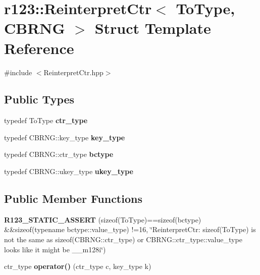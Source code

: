 \hypertarget{structr123_1_1ReinterpretCtr}{}\section{r123\+:\+:Reinterpret\+Ctr$<$ To\+Type, C\+B\+R\+NG $>$ Struct Template Reference}
\label{structr123_1_1ReinterpretCtr}


{\ttfamily \#include $<$Reinterpret\+Ctr.\+hpp$>$}

\subsection*{Public Types}
\begin{DoxyCompactItemize}
\item 
\hypertarget{structr123_1_1ReinterpretCtr_a26cf9e933b35411c37070c948085ba02}{}\label{structr123_1_1ReinterpretCtr_a26cf9e933b35411c37070c948085ba02} 
typedef To\+Type {\bfseries ctr\+\_\+type}
\item 
\hypertarget{structr123_1_1ReinterpretCtr_a470b21676ed709aa9d9ad524a67410f1}{}\label{structr123_1_1ReinterpretCtr_a470b21676ed709aa9d9ad524a67410f1} 
typedef C\+B\+R\+N\+G\+::key\+\_\+type {\bfseries key\+\_\+type}
\item 
\hypertarget{structr123_1_1ReinterpretCtr_ae0accaee618b5eb28a24acd516b3a4c6}{}\label{structr123_1_1ReinterpretCtr_ae0accaee618b5eb28a24acd516b3a4c6} 
typedef C\+B\+R\+N\+G\+::ctr\+\_\+type {\bfseries bctype}
\item 
\hypertarget{structr123_1_1ReinterpretCtr_a4b0b69c1aa58d62bb22e51e16c586bee}{}\label{structr123_1_1ReinterpretCtr_a4b0b69c1aa58d62bb22e51e16c586bee} 
typedef C\+B\+R\+N\+G\+::ukey\+\_\+type {\bfseries ukey\+\_\+type}
\end{DoxyCompactItemize}
\subsection*{Public Member Functions}
\begin{DoxyCompactItemize}
\item 
\hypertarget{structr123_1_1ReinterpretCtr_ad6fe140cb2f1aa215c4741f646249b16}{}\label{structr123_1_1ReinterpretCtr_ad6fe140cb2f1aa215c4741f646249b16} 
{\bfseries R123\+\_\+\+S\+T\+A\+T\+I\+C\+\_\+\+A\+S\+S\+E\+RT} (sizeof(To\+Type)==sizeof(bctype) \&\&sizeof(typename bctype\+::value\+\_\+type) !=16, \char`\"{}Reinterpret\+Ctr\+:  sizeof(To\+Type) is not the same as sizeof(C\+B\+R\+N\+G\+::ctr\+\_\+type) or C\+B\+R\+N\+G\+::ctr\+\_\+type\+::value\+\_\+type looks like it might be \+\_\+\+\_\+m128i\char`\"{})
\item 
\hypertarget{structr123_1_1ReinterpretCtr_a91edc5103397372cc5509ad17c0fc83a}{}\label{structr123_1_1ReinterpretCtr_a91edc5103397372cc5509ad17c0fc83a} 
ctr\+\_\+type {\bfseries operator()} (ctr\+\_\+type c, key\+\_\+type k)
\end{DoxyCompactItemize}


